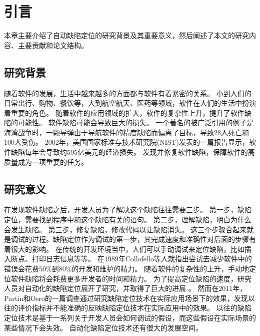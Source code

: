 \chapter{引言}

本章主要介绍了自动缺陷定位的研究背景及其重要意义，然后阐述了本文的研究内容、主要贡献和论文结构。

\section{研究背景}

随着软件的发展，生活中越来越多的方面都与软件有着紧密的关系。
小到人们的日常出行、购物、餐饮等，大到航空航天、医药等领域，软件在人们的生活中扮演着重要的角色。
随着软件的应用领域的扩大，软件的复杂性上升，提升了软件缺陷的可能性。
软件缺陷可能会导致巨大的损失。
一个著名的被广泛引用的例子是海湾战争时，一颗导弹由于导航软件的精度缺陷而偏离了目标，导致28人死亡和100人受伤\parencite{Zou2015A}。
2002年，美国国家标准与技术研究院(NIST)发表的一篇报告\parencite{NIST2002The}显示，软件缺陷每年会导致约595亿美元的经济损失。
发现并修复软件缺陷，保障软件的高质量成为一项重要的任务。

\section{研究意义}

在发现软件缺陷之后，开发人员为了解决这个缺陷往往需要三步\parencite{Parnin2011Are}。
第一步，缺陷定位，需要找到程序中和这个缺陷有关的语句。
第二步，理解缺陷，明白为什么会发生缺陷。
第三步，修复缺陷，修改代码以让缺陷消失。
这三个步骤合起来就是调试的过程。缺陷定位作为调试的第一步，其完成速度和准确性对后面的步骤有着很大的影响。
在传统的开发环境当中，人们可以手动调试来定位缺陷，比如插入断点、打印日志信息等等。
在1989年Collofello等人就指出尝试去减少软件中的错误会花费50\%到80\%的开发和维护的精力\parencite{Collofello1989Evaluating}。
随着软件的复杂性的上升，手动地定位软件缺陷将会耗费更多开发者的时间和精力。
为了提高定位缺陷的速度，研究人员对自动化的缺陷定位展开了研究，并取得了巨大的进展
\parencite{Weiser1981Program,Weiser1984Program,Reps1997The,Ball2003From,Groce2004Understanding,
Jones2002Visualization,Liblit2005Scalable,Liu2005SOBER,
Renieres2003Fault,Abreu2006An,Xie2013A,W2009BP,
Wong2012Effective,Le2016A,Papadakis2015Metallaxis,Moon2014Ask,Zhang2006Locating,
Chandra2011Angelic,Shapiro1982Algorithmic,Zeller2002Isolating,Zeller2002Simplifying}。
然而在2011年，Partin和Osro的一篇调查\parencite{Parnin2011Are}通过研究缺陷定位技术在实际应用场景下的效果，发现以往的评价指标并不能准确的反映缺陷定位技术在实际应用中的效果。
以往的缺陷定位技术是基于一系列关于开发人员会如何调试的假设，而这些假设在实际场景的某些情况下会失效。
自动化缺陷定位技术还有很大的发展空间。

